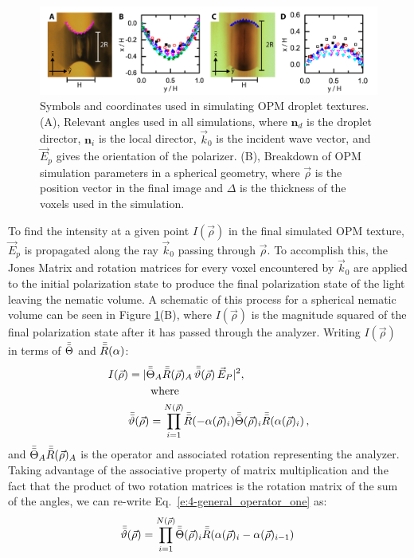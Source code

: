 \begin{figure}
\centering
\includegraphics{figures/C5/Ch5-Figs_ShapeContour.png}
\caption{Symbols and coordinates used in simulating OPM droplet textures.
(A), Relevant angles used in all simulations, where $\mathbf{n}_d$ is the droplet director, $\mathbf{n}_i$ is the local director, $\vec{k}_0$ is the incident wave vector, and $\vec{E}_p$ gives the orientation of the polarizer.
(B), Breakdown of OPM simulation parameters in a spherical geometry, where $\vec{\rho}$ is the position vector in the final image and $\Delta$ is the thickness of the voxels used in the simulation.}\label{f:4-generalcoords}
\end{figure}

To find the intensity at a given point $I(\vec{\rho})$ in the final simulated OPM texture, $\vec{E}_p$ is propagated along the ray $\vec{k}_0$ passing through $\vec{\rho}$.
To accomplish this, the Jones Matrix and rotation matrices for every voxel encountered by $\vec{k}_0$ are applied to the initial polarization state to produce the final polarization state of the light leaving the nematic volume.
A schematic of this process for a spherical nematic volume can be seen in Figure \ref{f:4-generalcoords}(B), where $I(\vec{\rho})$ is the magnitude squared of the final polarization state after it has passed through the analyzer.
Writing $I(\vec{\rho})$ in terms of $\bar{\bar{\Theta}}$ and $\bar{\bar{R}}(\alpha)$:
\begin{align}
I(\vec{\rho}) &= |\bar{\bar{\Theta}}_A \bar{\bar{R}}(\vec{\rho})_A\, \bar{\bar{\vartheta}}(\vec{\rho}) \, \vec{E}_P|^2, \, \label{e:4-Intensity} \\
 & \quad\quad\textrm{where}\\
        & \bar{\bar{\vartheta}}(\vec{\rho}) =  \prod_{i = 1}^{N(\vec{\rho})}\!\bar{\bar{R}}(-\alpha(\vec{\rho})_i) \bar{\bar{\Theta}}(\vec{\rho})_i \bar{\bar{R}}(\alpha(\vec{\rho})_i)\,, \label{e:4-general_operator_one}
\end{align}
and $\bar{\bar{\Theta}}_A \bar{\bar{R}}(\vec{\rho})_A$ is the operator and associated rotation representing the analyzer.
Taking advantage of the associative property of matrix multiplication and the fact that the product of two rotation matrices is the rotation matrix of the sum of the angles, we can re-write Eq.~\ref{e:4-general_operator_one} as:
\begin{equation}
\bar{\bar{\vartheta}}(\vec{\rho}) =  \prod_{i = 1}^{N(\vec{\rho})}\!\bar{\bar{\Theta}}(\vec{\rho})_i \bar{\bar{R}}(\alpha(\vec{\rho})_i-\alpha(\vec{\rho})_{i-1})\,
\end{equation}

